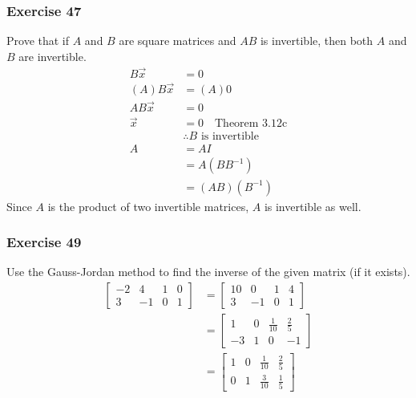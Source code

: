 \documentclass{math}
\begin{document}
\subsubsection*{Exercise 47}
Prove that if \( A \) and \( B \) are square matrices and \( AB \) is
invertible, then both \( A \) and \( B \) are invertible. \\
\begin{align*}
  B\vec{x} &= 0 \\
  (A)B\vec{x} &= (A)0 \\
  AB\vec{x} &= 0 \\
  \vec{x} &= 0 \quad \text{Theorem 3.12c} \\
  & \therefore B \text{ is invertible} \\
  A &= AI \\
  &= A(BB^{-1}) \\
  &= (AB)(B^{-1})
\end{align*}
Since \( A \) is the product of two invertible matrices, \( A \) is invertible
as well.

\subsubsection*{Exercise 49}
Use the Gauss-Jordan method to find the inverse of the given matrix (if it
exists).
\begin{align*}
  \begin{bmatrix}
    -2 & 4 & 1 & 0 \\
    3 & -1 & 0 & 1
  \end{bmatrix} &= \begin{bmatrix}
    10 & 0 & 1 & 4 \\
    3 & -1 & 0 & 1
  \end{bmatrix} \\
  &= \begin{bmatrix}
    1 & 0 & \frac{1}{10} & \frac{2}{5} \\[0.25em]
    -3 & 1 & 0 & -1
  \end{bmatrix} \\
  &= \begin{bmatrix}
    1 & 0 & \frac{1}{10} & \frac{2}{5} \\[0.25em]
    0 & 1 & \frac{3}{10} & \frac{1}{5}
  \end{bmatrix}
\end{align*}
\end{document}
